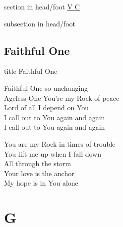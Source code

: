 \documentclass[aspectratio=169]{beamer}
\begin{document}
{
{ 
 {
 \begin{beamercolorbox}[ht=4.5ex,dp=1.5ex,%
      leftskip=.3cm,rightskip=.3cm plus1fil]{section in head/foot}
 \fontsize{12}{25}\selectfont 
\hyperlink{Faithful One[]V}{V  }\hyperlink{Faithful One[]C}{C  } 
 \end{beamercolorbox}%
  \begin{beamercolorbox}[ht=2.5ex,dp=1.125ex,%
   leftskip=.3cm,rightskip=.3cm plus1fil]{subsection in head/foot}
   \insertauthor
 \end{beamercolorbox}%
 }
}
\subsection{Faithful One}
\hypertarget{Faithful One[]}{}
\begin{frame}{}
 \vfill
  \centering
  \begin{beamercolorbox}[sep=8pt,center,shadow=true,rounded=true]{title}
    Faithful One     
  \end{beamercolorbox}
  \vfill
\end{frame}

\hypertarget{Faithful One[]V}{}
\begin{frame}{}
\fontsize{25.714285714285715}{30.857142857142858}\selectfont

Faithful One so unchanging\\ 
Ageless One You're my Rock of peace\\ 
Lord of all I depend on You\\ 
I call out to You again and again\\ 
I call out to You again and again

\end{frame}
\hypertarget{Faithful One[]C}{}
\begin{frame}{}
\fontsize{25.714285714285715}{30.857142857142858}\selectfont

You are my Rock in times of trouble\\ 
You lift me up when I fall down\\ 
All through the storm\\ 
Your love is the anchor\\ 
My hope is in You alone

\end{frame}
}

\section{ G }
\end{document}
